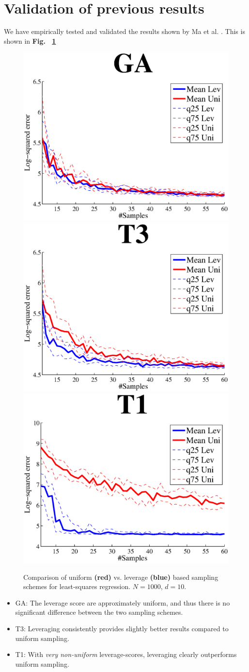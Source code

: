 \documentclass{article}
\begin{document}
\section{Validation of previous results}
We have empirically tested and validated the results shown by Ma et al. \cite{Ma}. This is shown in {\bf Fig.~ \ref{fig:regression_results}}
\begin{figure}[t]
\centering
\includegraphics[width=.49\linewidth]{images/GALS.eps}
\includegraphics[width=.49\linewidth]{images/T3LS.eps}
\includegraphics[width=.49\linewidth]{images/T1LS.eps}
\caption{Comparison of uniform {\bf\color{red}(red)} vs. leverage {\bf\color{blue}(blue)} based sampling schemes for least-squares regression. $N = 1000$, $d = 10$.}
\label{fig:regression_results}
\end{figure}

\begin{itemize}
\item GA: The leverage score are approximately uniform, and thus there is no significant difference between the two sampling schemes.
\item T3: Leveraging consistently provides slightly better results compared to uniform sampling.
\item T1: With \emph{very non-uniform} leverage-scores, leveraging clearly outperforms uniform sampling.
\end{itemize}
\end{document}
